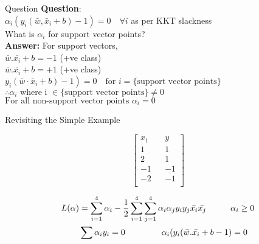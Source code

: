 \documentclass{beamer}
\begin{document}
\begin{frame}{Question}
\textbf{Question}:\\
\vspace{2mm}
$\alpha_{i}\left(y_{i}\left(\bar{w}, \bar{x}_{i}+b\right)-1\right)=0 \quad \forall i$ as per KKT slackness\\
\vspace{2mm}
What is $\alpha_{i}$ for support vector points?\\
\vspace{4mm}
\textbf{Answer:}
For support vectors,\\
\hspace{1in}$\bar{w}.\bar{x_{i}} + b  = -1$ (+ve class)\\
\hspace{1in}$\bar{w}.\bar{x_{i}} + b  = +1$ (+ve class)\\
\vspace{2mm}
$\left.y_{i}\left(\bar{w} \cdot \bar{x}_{i}+b\right)-1\right)=0 \quad \text {for } i=\{\text{support vector points\}}$
$\therefore \alpha_{i} \text { where i } \in \text{\{support vector points\}} \neq 0$
\vspace{5mm}
$\text{For all non-support vector points }\alpha_{i} = 0$
\end{frame}

{
	
}


\begin{frame}{Revisiting the Simple Example}


\begin{equation*}
\begin{bmatrix}
x_{1} && y \\
1 && 1\\
2 && 1\\
-1 && -1\\
-2 && -1\\
\end{bmatrix}
\end{equation*}

\begin{align*}
L(\alpha) &= \sum_{i=1}^{4} \alpha_{i} - \frac{1}{2}\sum_{i=1}^{4}\sum_{j=1}^{4}\alpha_{i}\alpha_{j}y_{i}y_{j}\bar{x_i}\bar{x_j} \hspace{1cm}\alpha_{i} \geq 0 \\
&\sum \alpha_{i}y_{i} = 0 \hspace{1.5cm}
\alpha_{i}(y_{i}(\bar{w}.\bar{x_i} + b - 1) = 0
\end{align*}

\end{frame}
\end{document}
